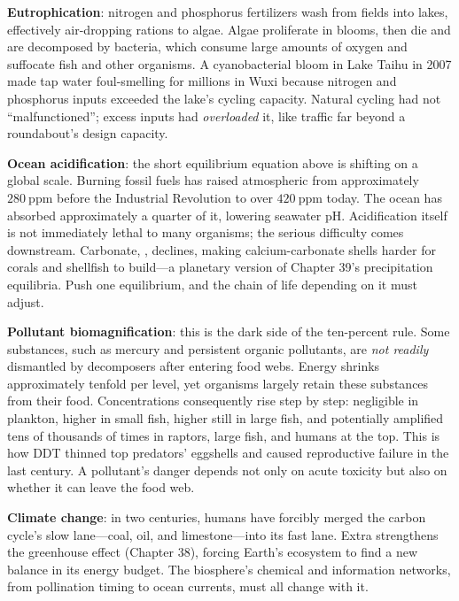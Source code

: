 \textbf{Eutrophication}: nitrogen and phosphorus fertilizers wash from fields into lakes, effectively air-dropping rations to algae. Algae proliferate in blooms, then die and are decomposed by bacteria, which consume large amounts of oxygen and suffocate fish and other organisms. A cyanobacterial bloom in Lake Taihu in 2007 made tap water foul-smelling for millions in Wuxi because nitrogen and phosphorus inputs exceeded the lake's cycling capacity. Natural cycling had not ``malfunctioned''; excess inputs had \emph{overloaded} it, like traffic far beyond a roundabout's design capacity.

\textbf{Ocean acidification}: the short equilibrium equation above is shifting on a global scale. Burning fossil fuels has raised atmospheric  from approximately $280\ \mathrm{ppm}$ before the Industrial Revolution to over $420\ \mathrm{ppm}$ today. The ocean has absorbed approximately a quarter of it, lowering seawater pH. Acidification itself is not immediately lethal to many organisms; the serious difficulty comes downstream. Carbonate, , declines, making calcium-carbonate shells harder for corals and shellfish to build---a planetary version of Chapter 39's precipitation equilibria. Push one equilibrium, and the chain of life depending on it must adjust.

\textbf{Pollutant biomagnification}: this is the dark side of the ten-percent rule. Some substances, such as mercury and persistent organic pollutants, are \emph{not readily} dismantled by decomposers after entering food webs. Energy shrinks approximately tenfold per level, yet organisms largely retain these substances from their food. Concentrations consequently rise step by step: negligible in plankton, higher in small fish, higher still in large fish, and potentially amplified tens of thousands of times in raptors, large fish, and humans at the top. This is how DDT thinned top predators' eggshells and caused reproductive failure in the last century. A pollutant's danger depends not only on acute toxicity but also on whether it can leave the food web.

\textbf{Climate change}: in two centuries, humans have forcibly merged the carbon cycle's slow lane---coal, oil, and limestone---into its fast lane. Extra  strengthens the greenhouse effect (Chapter 38), forcing Earth's ecosystem to find a new balance in its energy budget. The biosphere's chemical and information networks, from pollination timing to ocean currents, must all change with it.

